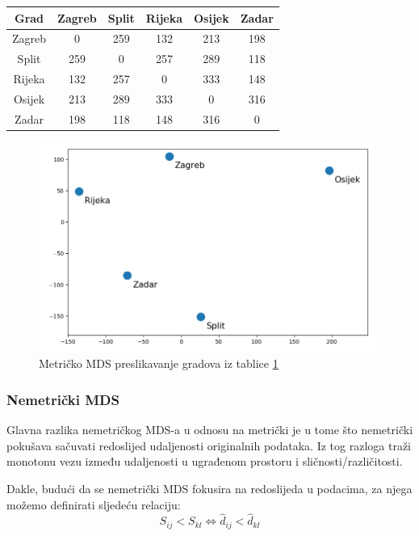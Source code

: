 \documentclass[times, utf8, diplomski]{fer}
\begin{document}
\begin{table}[htb]
    \centering
    \begin{tabular}{|c|c|c|c|c|c|}
        \hline
        Grad   & Zagreb & Split & Rijeka & Osijek & Zadar \\\hline
        Zagreb & 0      & 259   & 132    & 213    & 198   \\\hline
        Split  & 259    & 0     & 257    & 289    & 118   \\\hline
        Rijeka & 132    & 257   & 0      & 333    & 148   \\\hline
        Osijek & 213    & 289   & 333    & 0      & 316   \\\hline
        Zadar  & 198    & 118   & 148    & 316    & 0     \\\hline
    \end{tabular}
    \label{tab:hr_cities}
\end{table}
\begin{figure}[htb]
    \centering
    \includegraphics[width=11cm]{resources/images/reduction/mds_mapping_hr_metric.png}
    \caption{Metričko MDS preslikavanje gradova iz tablice \ref{tab:hr_cities}}
    \label{fig:mds_mapping_hr_metric}
\end{figure}


\subsubsection{Nemetrički MDS}
Glavna razlika nemetričkog MDS-a  u odnosu na metrički je u tome što nemetrički pokušava sačuvati redoslijed udaljenosti originalnih podataka. Iz tog razloga traži monotonu vezu između udaljenosti u ugrađenom prostoru i sličnosti/različitosti.

Dakle, budući da se nemetrički MDS fokusira na redoslijeda u podacima, za njega možemo definirati sljedeću relaciju:
\begin{equation}
    S_{ij} < S_{kl} \iff \hat{d}_{ij} < \hat{d}_{kl}
\end{equation}
\end{document}
